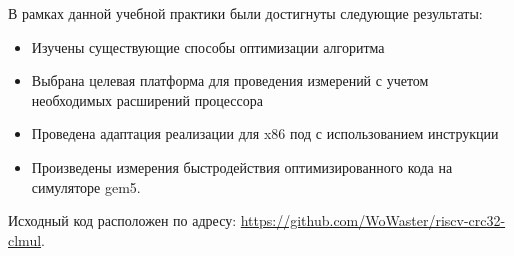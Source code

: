 
В рамках данной учебной практики были достигнуты следующие результаты:

\begin{itemize}
    \item Изучены существующие способы оптимизации алгоритма \crctt{}
    \item Выбрана целевая платформа для проведения измерений с учетом необходимых расширений процессора
    \item Проведена адаптация реализации для x86 под \riscv{} с использованием инструкции \clmul{}
    \item Произведены измерения быстродействия оптимизированного кода на симуляторе gem5.
\end{itemize}

Исходный код расположен по адресу: \url{https://github.com/WoWaster/riscv-crc32-clmul}.

